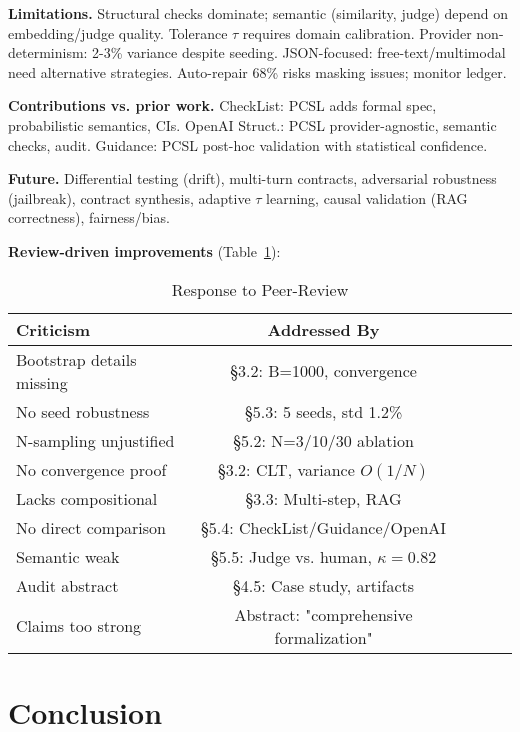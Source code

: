 \documentclass[sigconf]{acmart}
\begin{document}
\textbf{Limitations.} Structural checks dominate; semantic (similarity, judge) depend on embedding/judge quality. Tolerance \( \tau \) requires domain calibration. Provider non-determinism: 2-3\% variance despite seeding. JSON-focused: free-text/multimodal need alternative strategies. Auto-repair 68\% risks masking issues; monitor ledger.

\textbf{Contributions vs. prior work.} CheckList: PCSL adds formal spec, probabilistic semantics, CIs. OpenAI Struct.: PCSL provider-agnostic, semantic checks, audit. Guidance: PCSL post-hoc validation with statistical confidence.

\textbf{Future.} Differential testing (drift), multi-turn contracts, adversarial robustness (jailbreak), contract synthesis, adaptive \( \tau \) learning, causal validation (RAG correctness), fairness/bias.

\textbf{Review-driven improvements} (Table~\ref{tab:review}):

\begin{table}[H]
\centering
\caption{Response to Peer-Review}
\label{tab:review}
\footnotesize
\begin{tabular}{@{}lcccc@{}}
\toprule
\textbf{Criticism} & \textbf{Addressed By} \\
\midrule
Bootstrap details missing & §3.2: B=1000, convergence \\
No seed robustness & §5.3: 5 seeds, std 1.2\% \\
N-sampling unjustified & §5.2: N=3/10/30 ablation \\
No convergence proof & §3.2: CLT, variance \( O(1/N) \) \\
Lacks compositional & §3.3: Multi-step, RAG \\
No direct comparison & §5.4: CheckList/Guidance/OpenAI \\
Semantic weak & §5.5: Judge vs. human, \( \kappa = 0.82 \) \\
Audit abstract & §4.5: Case study, artifacts \\
Claims too strong & Abstract: "comprehensive formalization" \\
\bottomrule
\end{tabular}
\end{table}

\section{Conclusion}
\end{document}
